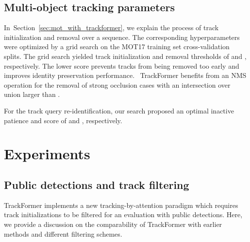 \documentclass[10pt,twocolumn,letterpaper]{article}
\newcommand{\secref}[1]{Section~\ref{#1}}
\begin{document}
\subsection{Multi-object tracking parameters} \label{sec:impl_details_params}

In~\secref{sec:mot_with_trackformer}, we explain the process of track initialization and removal over a sequence.
The corresponding hyperparameters were optimized by a grid search on the MOT17 training set cross-validation splits.
The grid search yielded track initialization and removal thresholds of  and , respectively.
The lower  score prevents tracks from being removed too early and improves identity preservation performance.
~\mbox{TrackFormer} benefits from an NMS operation for the removal of strong occlusion cases with an intersection over union larger than .


For the track query re-identification, our search proposed an optimal inactive patience and score of  and , respectively.

\section{Experiments} \label{sec:results}

\subsection{Public detections and track filtering} \label{sec:results_public}
    TrackFormer implements a new tracking-by-attention paradigm which requires track initializations to be filtered for an evaluation with public detections.
Here, we provide a discussion on the comparability of TrackFormer with earlier methods and different filtering schemes.
\end{document}
